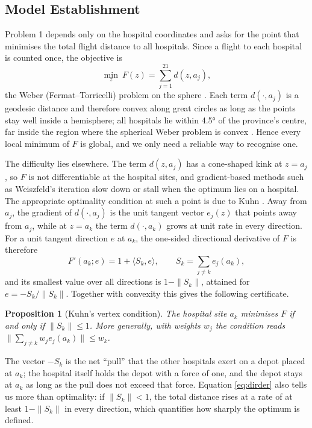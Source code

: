 \documentclass[11pt,a4paper]{article}
\newtheorem{proposition}{Proposition}
\theoremstyle{definition}
\begin{document}
\subsection{Model Establishment}
Problem 1 depends only on the hospital coordinates and asks for the point that minimises the total flight distance to all hospitals.
Since a flight to each hospital is counted once, the objective is
\begin{equation}\label{eq:weber}
\min_{z}\ F(z)=\sum_{j=1}^{21} d(z,a_j),
\end{equation}
the Weber (Fermat--Torricelli) problem on the sphere \citep{drezner2002,drezner1978}.
Each term $d(\cdot,a_j)$ is a geodesic distance and therefore convex along great circles as long as the points stay well inside a hemisphere; all hospitals lie within 4.5° of the province's centre, far inside the region where the spherical Weber problem is convex \citep{drezner1978}.
Hence every local minimum of $F$ is global, and we only need a reliable way to recognise one.

The difficulty lies elsewhere.
The term $d(z,a_j)$ has a cone-shaped kink at $z=a_j$, so $F$ is not differentiable at the hospital sites, and gradient-based methods such as Weiszfeld's iteration \citep{weiszfeld1937} slow down or stall when the optimum lies on a hospital.
The appropriate optimality condition at such a point is due to Kuhn \citep{kuhn1973}.
Away from $a_j$, the gradient of $d(\cdot,a_j)$ is the unit tangent vector $e_j(z)$ that points away from $a_j$, while at $z=a_k$ the term $d(\cdot,a_k)$ grows at unit rate in every direction.
For a unit tangent direction $e$ at $a_k$, the one-sided directional derivative of $F$ is therefore
\begin{equation}\label{eq:dirder}
F'(a_k;e) = 1 + \langle S_k, e\rangle, \qquad S_k = \sum_{j\neq k} e_j(a_k),
\end{equation}
and its smallest value over all directions is $1-\|S_k\|$, attained for $e=-S_k/\|S_k\|$.
Together with convexity this gives the following certificate.

\begin{proposition}[Kuhn's vertex condition]\label{prop:kuhn}
The hospital site $a_k$ minimises $F$ if and only if $\|S_k\|\le 1$.
More generally, with weights $w_j$ the condition reads $\|\sum_{j\ne k} w_j e_j(a_k)\|\le w_k$.
\end{proposition}

The vector $-S_k$ is the net ``pull'' that the other hospitals exert on a depot placed at $a_k$; the hospital itself holds the depot with a force of one, and the depot stays at $a_k$ as long as the pull does not exceed that force.
Equation \eqref{eq:dirder} also tells us more than optimality: if $\|S_k\|<1$, the total distance rises at a rate of at least $1-\|S_k\|$ in every direction, which quantifies how sharply the optimum is defined.
\end{document}
